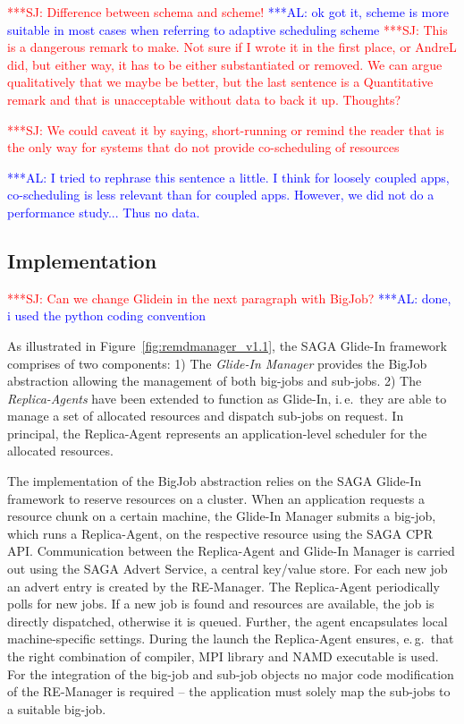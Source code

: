 \documentclass{rspublic}
\newcommand{\alnote}[1]{ {\textcolor{blue} { ***AL: #1 }}}
\newcommand{\jhanote}[1]{ {\textcolor{red} { ***SJ: #1 }}}
\newcommand{\alnote}[1]{}
\newcommand{\jhanote}[1]{}
\newcommand{\replicaagent}[1]{Replica-Agent }
\begin{document}
\jhanote{Difference between schema and scheme!}
\alnote{ok got it, scheme is more suitable in most cases when referring to adaptive
scheduling scheme}
\jhanote{This is a dangerous remark to
  make. Not sure if I wrote it in the first place, or AndreL did, but
  either way, it has to be either substantiated or removed. We can
  argue qualitatively that we maybe be better, but the last sentence
  is a Quantitative remark and that is unacceptable without data to
  back it up. Thoughts?}

\jhanote{We could caveat it by saying, short-running or remind the
  reader that is the only way for systems that do not provide
  co-scheduling of resources}

\alnote{I tried to rephrase this sentence a little. I think for loosely coupled
apps, co-scheduling is less relevant than for coupled apps. However,
we did not do a performance study... Thus no data.}   
         
\subsection{Implementation}
\jhanote{Can we change Glidein in the next paragraph with BigJob?}
\alnote{done, i used the python coding convention}    
                   

As illustrated in Figure~\ref{fig:remdmanager_v1.1}, the SAGA Glide-In
framework comprises of two components: 1) The \emph{Glide-In Manager}
provides the BigJob abstraction allowing the management of both
big-jobs and sub-jobs.  2) The \emph{Replica-Agents} have been extended
to function as Glide-In, i.\,e.\ they are able to manage a set of
allocated resources and dispatch sub-jobs on request. 
In principal, the Replica-Agent represents an application-level
scheduler for the allocated resources.  
            
The implementation of the BigJob abstraction relies on the SAGA 
Glide-In framework to reserve resources on a cluster.
When an application requests a resource chunk on a certain machine, 
the Glide-In Manager submits a big-job, which runs a Replica-Agent, 
on the respective resource using the SAGA CPR API.
Communication between the Replica-Agent and Glide-In
Manager is carried out using the SAGA Advert Service, a central
key/value store. For each new job an advert entry is created by the
RE-Manager. The \replicaagent\ periodically polls for new jobs.  If a
new job is found and resources are available, the job is directly dispatched,
otherwise it is queued. Further, the agent encapsulates local machine-specific
settings. During the launch the \replicaagent\ ensures, e.\,g.\ 
that the right combination of compiler, MPI library and NAMD 
executable is used.
For the integration of the big-job and sub-job objects
no major code modification of the RE-Manager is required 
-- the application must solely map the sub-jobs to a suitable big-job.
\end{document}

